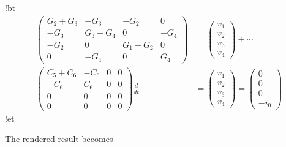 \documentclass[%
oneside,                 %
final,                   %
10pt]{article}
\begin{document}
\blatexcod
!bt
\begin{align*}
\begin{pmatrix}
G_2 + G_3 & -G_3 & -G_2 & 0 \\ 
-G_3 & G_3 + G_4 & 0 & -G_4 \\ 
-G_2 & 0 & G_1 + G_2 & 0 \\ 
0 & -G_4 & 0 & G_4
\end{pmatrix}
&=
\begin{pmatrix}
v_1 \\ 
v_2 \\ 
v_3 \\ 
v_4
\end{pmatrix}
+ \cdots \\ 
\begin{pmatrix}
C_5 + C_6 & -C_6 & 0 & 0 \\ 
-C_6 & C_6 & 0 & 0 \\ 
0 & 0 & 0 & 0 \\ 
0 & 0 & 0 & 0
\end{pmatrix}
\frac{d}{dt} &=
\begin{pmatrix}
v_1 \\ 
v_2 \\ 
v_3 \\ 
v_4
\end{pmatrix} =
\begin{pmatrix}
0 \\ 
0 \\ 
0 \\ 
-i_0
\end{pmatrix}
\end{align*}
!et

\elatexcod


The rendered result becomes
\end{document}
